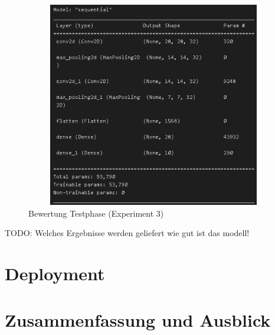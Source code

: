 \documentclass[12pt]{scrreprt}
\begin{document}
\begin{figure}[h!]
	\centering
	\includegraphics[width=15cm,height=9cm]		{ExperimentModelAufbau_1.png}
	\caption{ Bewertung Testphase \cite{HK22}(Experiment 3)}
	\label{fig:fig20}
\end{figure}

TODO: Welches Ergebnisse werden geliefert wie gut ist das modell!

\section{Deployment}\label{dp:dp}

	
\section{Zusammenfassung und Ausblick}


\cleardoubleoddpage




\cleardoublepage
	
\end{document}
